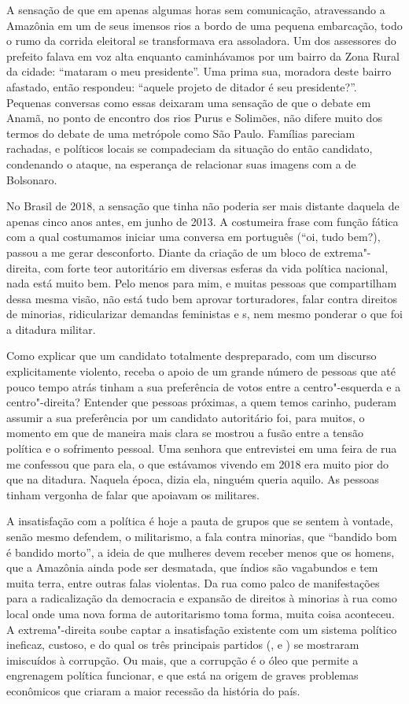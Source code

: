 A sensação de que em apenas algumas horas sem comunicação, atravessando
a Amazônia em um de seus imensos rios a bordo de uma pequena embarcação,
todo o rumo da corrida eleitoral se transformava era assoladora. Um dos
assessores do prefeito falava em voz alta enquanto caminhávamos por um
bairro da Zona Rural da cidade: ``mataram o meu presidente''. Uma prima
sua, moradora deste bairro afastado, então respondeu: ``aquele projeto
de ditador é seu presidente?''. Pequenas conversas como essas deixaram
uma sensação de que o debate em Anamã, no ponto de encontro dos rios
Purus e Solimões, não difere muito dos termos do debate de uma metrópole
como São Paulo. Famílias pareciam rachadas, e políticos locais se
compadeciam da situação do então candidato, condenando o ataque, na
esperança de relacionar suas imagens com a de Bolsonaro.

No Brasil de 2018, a sensação que tinha não poderia ser mais distante
daquela de apenas cinco anos antes, em junho de 2013. A costumeira frase
com função fática com a qual costumamos iniciar uma conversa em
português (``oi, tudo bem?), passou a me gerar desconforto. Diante da
criação de um bloco de extrema"-direita, com forte teor autoritário em
diversas esferas da vida política nacional, nada está muito bem. Pelo
menos para mim, e muitas pessoas que compartilham dessa mesma visão, não
está tudo bem aprovar torturadores, falar contra direitos de minorias,
ridicularizar demandas feministas e s, nem mesmo ponderar o que
foi a ditadura militar.

Como explicar que um candidato totalmente despreparado, com um discurso
explicitamente violento, receba o apoio de um grande número de pessoas
que até pouco tempo atrás tinham a sua preferência de votos entre a
centro"-esquerda e a centro"-direita? Entender que pessoas próximas, a
quem temos carinho, puderam assumir a sua preferência por um candidato
autoritário foi, para muitos, o momento em que de maneira mais clara se
mostrou a fusão entre a tensão política e o sofrimento pessoal. Uma
senhora que entrevistei em uma feira de rua me confessou que para ela, o
que estávamos vivendo em 2018 era muito pior do que na ditadura. Naquela
época, dizia ela, ninguém queria aquilo. As pessoas tinham vergonha de
falar que apoiavam os militares.

A insatisfação com a política é hoje a pauta de grupos que se sentem à
vontade, senão mesmo defendem, o militarismo, a fala contra minorias,
que ``bandido bom é bandido morto'', a ideia de que mulheres devem
receber menos que os homens, que a Amazônia ainda pode ser desmatada,
que índios são vagabundos e tem muita terra, entre outras falas
violentas. Da rua como palco de manifestações para a radicalização da
democracia e expansão de direitos à minorias à rua como local onde uma
nova forma de autoritarismo toma forma, muita coisa aconteceu. A
extrema"-direita soube captar a insatisfação existente com um sistema
político ineficaz, custoso, e do qual os três principais partidos (,
 e ) se mostraram imiscuídos à corrupção. Ou mais, que a
corrupção é o óleo que permite a engrenagem política funcionar, e que
está na origem de graves problemas econômicos que criaram a maior
recessão da história do país.

